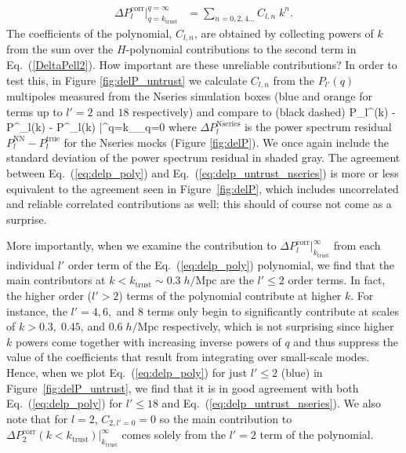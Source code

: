 \begin{align} \label{eq:delp_poly}
\Delta P^\mathrm{corr}_l \bigg|_{q=k_\mathrm{trust}}^{q=\infty} &= 
\sum\limits_{n= 0, 2, 4 ... } C_{l,n}\;k^{n}. 
\end{align}
The coefficients of the polynomial, $C_{l, n}$, are obtained by collecting powers of $k$ from the sum over the $H$-polynomial contributions to the second term in Eq.~(\ref{DeltaPell2}). How important are these unreliable contributions? In order to test this, in Figure \ref{fig:delP_untrust} 
we calculate $C_{l, n}$ from the $P_{l'}(q)$ multipoles measured 
from the Nseries simulation boxes (blue and orange for terms up 
                                                                                                                                                                                                                                                                            to $l'=2$ and $18$ respectively) and compare to (black dashed)
\beq \label{eq:delp_untrust_nseries}
    \Delta P_l^(k) - \Delta P^_l(k) - 
    \Delta P^_l(k) \bigg|^{q=k_}_{q=0}
\eeq  
where $\Delta P_l^\mathrm{Nseries}$ is the power spectrum 
residual $P_l^\mathrm{NN}- P_l^\mathrm{true}$ for the Nseries mocks (Figure \ref{fig:delP}). We once again include the standard deviation 
of the power spectrum residual in shaded gray. The agreement 
between Eq.~(\ref{eq:delp_poly}) and Eq.~(\ref{eq:delp_untrust_nseries}) 
is more or less equivalent to the agreement seen in Figure~\ref{fig:delP}, which includes uncorrelated and reliable correlated contributions as well; this 
should of course not come as a surprise.

More importantly, when we examine the contribution to 
$\Delta P^\mathrm{corr}_l |_{k_\mathrm{trust}}^\infty$ from each individual 
$l'$ order term of the Eq.~(\ref{eq:delp_poly}) polynomial, we find that the
main contributors at $k < k_\mathrm{trust} \sim 0.3\; h/\mathrm{Mpc}$ are 
the $l' \leq 2$ order terms. In fact, the higher order ($l' > 2$) terms of the 
polynomial contribute at higher $k$. For instance, the $l' = 4, 6,$ and $ 8$ terms 
only begin to significantly contribute at scales of $k > 0.3, \; 0.45$, and 
$0.6\;h/\mathrm{Mpc}$ respectively, which is not surprising since higher $k$ powers come together with increasing inverse powers of $q$ and thus suppress the value of the coefficients that result from integrating over small-scale modes. Hence, when we plot Eq.~(\ref{eq:delp_poly})  
for just $l' \leq 2$ (blue) in Figure~\ref{fig:delP_untrust}, we find that 
it is in good agreement with both Eq.~(\ref{eq:delp_poly}) for $l' \leq 18$ 
and Eq.~(\ref{eq:delp_untrust_nseries}). We also note that for $l = 2$, 
$C_{2, l'=0} = 0$ so the main contribution to 
$\Delta P^\mathrm{corr}_2(k < k_\mathrm{trust}) |_{k_\mathrm{trust}}^\infty$ 
comes solely from the $l' = 2$ term of the polynomial. 

